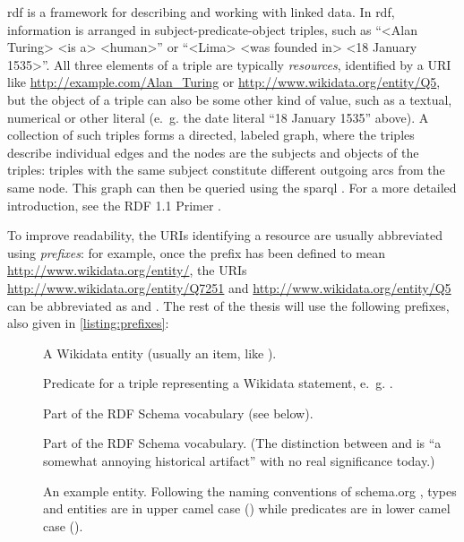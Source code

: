 \acrfull{rdf}
\cite{Lanthaler:14:RCA}
is a framework for describing and working with linked data.
In \gls{rdf}, information is arranged in subject-predicate-object triples,
such as “<Alan Turing> <is a> <human>”
or “<Lima> <was founded in> <18 January 1535>”.
All three elements of a triple are typically \emph{resources},
identified by a URI like \url{http://example.com/Alan_Turing} or \url{http://www.wikidata.org/entity/Q5}, %
but the object of a triple can also be some other kind of value,
such as a textual, numerical or other literal
(e.~g. the date literal “18 January 1535” above). %
A collection of such triples forms a directed, labeled graph,
where the triples describe individual edges
and the nodes are the subjects and objects of the triples:
triples with the same subject constitute different outgoing arcs from the same node.
This graph can then be queried using the \acrlong{sparql} \cite{9569543}. %
For a more detailed introduction,
see the RDF 1.1 Primer \cite{Schreiber:14:RP}.

To improve readability, the URIs identifying a resource are usually abbreviated using \emph{prefixes}:
for example, once the prefix  has been defined to mean \url{http://www.wikidata.org/entity/},
the URIs \url{http://www.wikidata.org/entity/Q7251} and \url{http://www.wikidata.org/entity/Q5}
can be abbreviated as  and .
The rest of the thesis will use the following prefixes,
also given in \cref{listing:prefixes}:

\begin{description}
\item[] A Wikidata entity (usually an item, like ).
\item[] Predicate for a triple representing a Wikidata statement, e.~g. .
\item[] Part of the RDF Schema vocabulary (see below).
\item[] Part of the RDF Schema vocabulary.
  (The distinction between  and  is “a somewhat annoying historical artifact” \cite{Schreiber:14:RP}
  with no real significance today.)
\item[] An example entity.
  Following the naming conventions of schema.org \cite{schema.org-old-extension},
  types and entities are in upper camel case ()
  while predicates are in lower camel case ().
\end{description}


